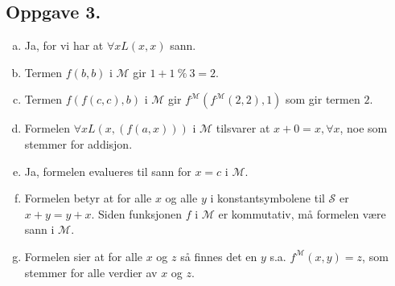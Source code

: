 \documentclass{article}
\begin{document}
\subsection*{Oppgave 3.}
\begin{enumerate}[(a)]
    \item {
        Ja, for vi har at $\forall x L(x, x)$ sann.
    }
    \item {
        Termen $f(b, b)$ i $\mathcal{M}$ gir $1 + 1 \:\%\: 3 = 2$.
    }
    \item {
        Termen $f(f(c, c), b)$ i $\mathcal{M}$ gir $f^{\mathcal{M}}(f^{\mathcal{M}}(2, 2), 1)$ som gir termen $2$.
    }
    \item {
        Formelen $\forall x L(x, (f(a, x)))$ i $\mathcal{M}$ tilsvarer at $x + 0 = x, \forall x$, noe som 
        stemmer for addisjon.
    }
    \item {
        Ja, formelen evalueres til sann for $x = c$ i $\mathcal{M}$.
    }
    \item {
        Formelen betyr at for alle $x$ og alle $y$ i konstantsymbolene til $\mathcal{S}$ er $x + y = y + x$. Siden funksjonen $f$ i $\mathcal{M}$ er 
        kommutativ, må formelen være sann i $\mathcal{M}$.
    }
    \item {
        Formelen sier at for alle $x$ og $z$ så finnes det en $y$ s.a. $f^{\mathcal{M}}(x, y) = z$, 
        som stemmer for alle verdier av $x$ og $z$.
    }
\end{enumerate}
\end{document}
